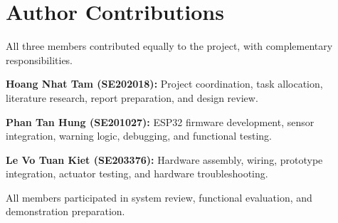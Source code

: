 \documentclass[12pt,a4paper]{article}
\begin{document}
\section*{Author Contributions}

All three members contributed equally
to the project, with complementary
responsibilities.

\textbf{Hoang Nhat Tam (SE202018):}
Project coordination, task allocation,
literature research, report preparation,
and design review.

\textbf{Phan Tan Hung (SE201027):}
ESP32 firmware development,
sensor integration, warning logic,
debugging, and functional testing.

\textbf{Le Vo Tuan Kiet (SE203376):}
Hardware assembly, wiring,
prototype integration, actuator testing,
and hardware troubleshooting.

All members participated in system
review, functional evaluation,
and demonstration preparation.
\end{document}
